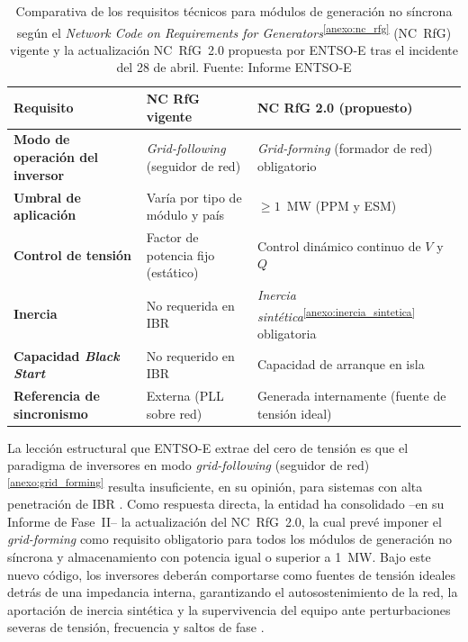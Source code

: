 \vspace{0.6cm}
\begin{table}[H]
\centering
\caption[Evolución de los requisitos para inversores IBR: NC RfG vigente vs NC RfG 2.0.]{%
Comparativa de los requisitos técnicos para módulos de generación no
síncrona según el \textit{Network Code on Requirements for
Generators}\textsuperscript{\ref{anexo:nc_rfg}} (NC~RfG) vigente y la
actualización NC~RfG~2.0 propuesta por ENTSO-E tras el incidente del
28 de abril. Fuente: Informe ENTSO-E \cite{entsoe2025}}
\label{tab:nc_rfg_comparativa}
\vspace{0.3cm}
\small
\begin{tabularx}{\textwidth}{>{\bfseries}p{3.8cm} >{\centering\arraybackslash}X >{\centering\arraybackslash}X}
\toprule
\textbf{Requisito} & \textbf{NC RfG vigente} & \textbf{NC RfG 2.0 (propuesto)} \\
\midrule
Modo de operación del inversor
    & \textit{Grid-following} (seguidor de red)
    & \textit{Grid-forming} (formador de red) obligatorio \\
\addlinespace
Umbral de aplicación
    & Varía por tipo de módulo y país
    & $\geq 1$~MW (PPM y ESM) \\
\addlinespace
Control de tensión
    & Factor de potencia fijo (estático)
    & Control dinámico continuo de $V$ y $Q$ \\
\addlinespace
Inercia
    & No requerida en IBR
    & \textit{Inercia sintética}\textsuperscript{\ref{anexo:inercia_sintetica}} obligatoria \\
\addlinespace
Capacidad \textit{Black Start}
    & No requerido en IBR
    & Capacidad de arranque en isla \\
\addlinespace
Referencia de sincronismo
    & Externa (PLL sobre red)
    & Generada internamente (fuente de tensión ideal) \\
\bottomrule
\end{tabularx}
\end{table}
\vspace{0.6cm}

La lección estructural que ENTSO-E extrae del cero de tensión es que el
paradigma de inversores en modo \textit{grid-following} (seguidor de
red)\textsuperscript{\ref{anexo:grid_forming}} resulta insuficiente, en
su opinión, para sistemas con alta penetración de IBR
\cite{entsoe2025,futured2024}. Como respuesta directa, la entidad ha
consolidado --en su Informe de Fase~II-- la actualización del NC~RfG~2.0, la cual prevé imponer el \textit{grid-forming} como requisito obligatorio
para todos los módulos de generación no síncrona y almacenamiento con
potencia igual o superior a 1~MW. Bajo este nuevo código, los
inversores deberán comportarse como fuentes de tensión ideales detrás
de una impedancia interna, garantizando el autosostenimiento de la red, la
aportación de inercia sintética y la supervivencia del equipo ante
perturbaciones severas de tensión, frecuencia y saltos de fase
\cite{entsoe2025,nrel2025}.

